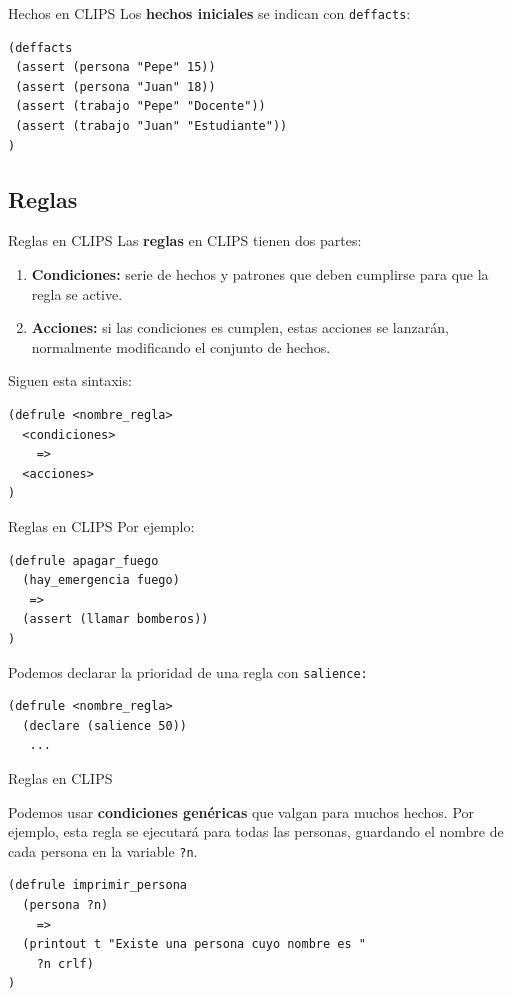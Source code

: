\documentclass[smaller,spanish,xcolor=svgnames]{beamer}
\begin{document}
\begin{frame}[fragile]{Hechos en CLIPS}
Los \textbf{hechos iniciales} se indican con \texttt{deffacts}:
\begin{verbatim}
(deffacts
 (assert (persona "Pepe" 15))
 (assert (persona "Juan" 18))
 (assert (trabajo "Pepe" "Docente"))
 (assert (trabajo "Juan" "Estudiante"))
)
\end{verbatim}  
\end{frame}

\subsection{Reglas}

\begin{frame}[fragile]{Reglas en CLIPS}
  Las \textbf{reglas} en CLIPS tienen dos partes:
  \begin{enumerate}
  \item \textbf{Condiciones:} serie de hechos y patrones que deben cumplirse
    para que la regla se active.
  \item \textbf{Acciones:} si las condiciones es cumplen, estas acciones se
    lanzarán, normalmente modificando el conjunto de hechos.
  \end{enumerate}

\bigskip

Siguen esta sintaxis:
\begin{verbatim}
(defrule <nombre_regla>
  <condiciones>
    =>
  <acciones>
)
\end{verbatim}
\end{frame}

\begin{frame}[fragile]{Reglas en CLIPS}
Por ejemplo:
\begin{verbatim}
(defrule apagar_fuego
  (hay_emergencia fuego)
   =>
  (assert (llamar bomberos))
)
\end{verbatim}  

Podemos declarar la prioridad de una regla con \texttt{salience:}

\begin{verbatim}
(defrule <nombre_regla>
  (declare (salience 50))
   ...
\end{verbatim}    
\end{frame}

\begin{frame}[fragile]{Reglas en CLIPS}

Podemos usar \textbf{condiciones genéricas} que valgan para muchos
hechos. Por ejemplo, esta regla se ejecutará para todas las personas, guardando
el nombre de cada persona en la variable \texttt{?n}.

\begin{verbatim}
(defrule imprimir_persona
  (persona ?n)
    =>
  (printout t "Existe una persona cuyo nombre es " 
    ?n crlf)
)
\end{verbatim}
\end{frame}
\end{document}
